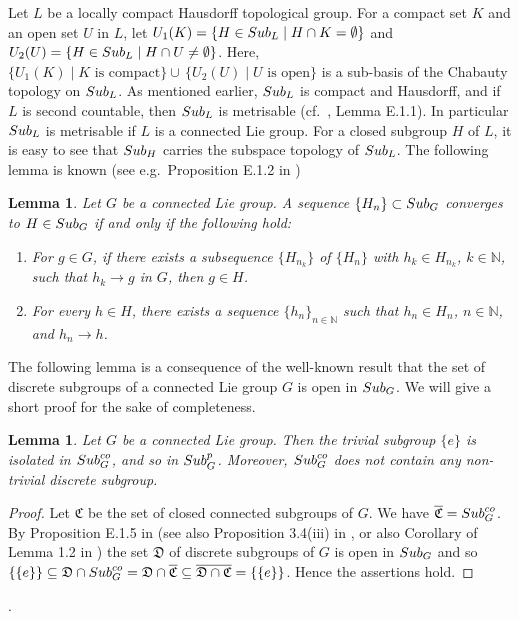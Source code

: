 \documentclass{amsart}
\numberwithin{equation}{section}
\newcommand{\Sub}{{\rm Sub}}
\newcommand{\N}{{\mathbb N}}
\newcommand{\spg}{{\rm Sub}^p_G}
\let\ol=\overline
\newtheorem{lem}[thm]{Lemma}
\theoremstyle{remark}
\begin{document}
Let $L$ be a locally compact Hausdorff topological group.
For a compact set $K$ and an open set $U$ in $L$, let 
$U_1(K)=\{ H \in \Sub_L \mid H \cap K = \emptyset \}$ and 
$U_2(U)= \{ H \in \Sub_L \mid H \cap U \neq \emptyset \}$. Here, 
$\{ U_1(K) \mid K \mbox { is compact} \} \cup \, \{ U_2(U) \mid U \mbox{ is open} \}$ 
is a sub-basis of the Chabauty topology on $\Sub_L$. As mentioned earlier, $\Sub_L$ is 
compact and Hausdorff, and if $L$ is second countable, then $\Sub_L$ is metrisable 
(cf.\  \cite{BP}, Lemma E.1.1). In particular $\Sub_L$ is metrisable if $L$ is a connected 
Lie group. For a closed subgroup $H$ of $L$, it is easy to see that $\Sub_H$ carries 
the subspace topology of $\Sub_L$. The following lemma is known (see e.g.\ Proposition E.1.2 in \cite{BP}) 

\begin{lem}\label{conv}
Let $G$ be a connected Lie group. A sequence 
$\{H_n\}\subset \Sub_G$ converges to $H\in \Sub_G$ 
if and only if the following hold:
\begin{enumerate}
\item[${\rm(I)}$] For $g\in G$, if there exists a subsequence $\{H_{n_k}\}$ of 
$\{H_n\}$ with $h_k\in H_{n_k}$, $k\in\N$, such that $h_k\to g$ in $G$, then $g\in H$. 
\item[${\rm(II)}$] For every $h\in H$, there exists a sequence $\{h_n\}_{n\in\N}$ such that
 $h_n\in H_n$, $n\in\N$, and $h_n\to h$.
\end{enumerate}
\end{lem}

The following lemma is a consequence of the well-known result that the set of discrete subgroups of a connected Lie group 
$G$ is open in $\Sub_G$. We will give a short proof for the sake of completeness.

\begin{lem} \label{discrete}
Let $G$ be a connected Lie group.  Then the trivial subgroup $\{e\}$ is isolated in $\Sub^{co}_G$, and so in $\spg$. Moreover, 
$\Sub^{co}_G$ does not contain any non-trivial discrete subgroup.
\end{lem} 

\begin{proof} Let $\mathfrak{C}$ be the set of closed connected subgroups of $G$. We have $\ol{\mathfrak{C}} = \Sub^{co}_G$. 
By Proposition E.1.5 in \cite{BP} (see also Proposition 3.4(iii) in \cite{BHK}, or also Corollary of Lemma 1.2 in
\cite{W}) the set $\mathfrak{D}$ of discrete subgroups of $G$ is open in $\Sub_G$ and so $\{\{e\}\} \subseteq\mathfrak{D}\cap \Sub^{co}_G
=\mathfrak{D} \cap \ol{\mathfrak{C}}\subseteq\ol{\mathfrak{D}\cap\mathfrak{C}} = \{\{e\}\}$. Hence the assertions hold.
\end{proof}.
\end{document}
